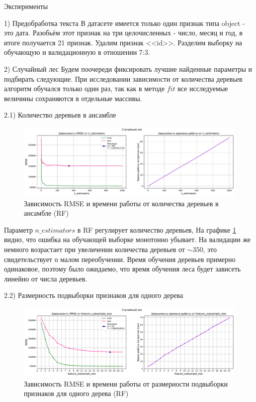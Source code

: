 \documentclass[a4paper,12pt,titlepage,finall]{article}
\begin{document}
\begin{section}{Эксперименты}
	
\begin{subsection}{1) Предобработка текста}
В датасете имеется только один признак типа object - это дата. Разобьём этот признак на три целочисленных - число, месяц и год, в итоге получается 21 признак. Удалим признак <<id>>. Разделим выборку на обучающую и валидационную в отношении 7:3.
\end{subsection}

\begin{subsection}{2) Случайный лес}
Будем поочереди фиксировать лучшие найденные параметры и подбирать следующие. При исследовании зависимости от количества деревьев алгоритм обучался только один раз, так как в методе $fit$ все исследуемые величины сохраняются в отдельные массивы.

\begin{subsubsection}{2.1) Количество деревьев в ансамбле}
\begin{figure}[H]
	\includegraphics[scale=0.9, width=17cm]{S_1.pdf}
	\centering
	\caption{Зависимость RMSE и времени работы от количества деревьев в ансамбле (RF)}
	\label{pic:1}
\end{figure}

Параметр $n\_estimators$ в RF регулирует количество деревьев,  На графике \ref{pic:1} видно, что ошибка на обучающей выборке монотонно убывает. На валидации же немного возрастает при увеличении количества деревьев от $\sim350$, это свидетельствует о малом переобучении. Время обучения деревьев примерно одинаковое, поэтому было ожидаемо, что время обучения леса будет зависеть линейно от числа деревьев.

\end{subsubsection}

\begin{subsubsection}{2.2) Размерность подвыборки признаков для одного дерева}
\begin{figure}[H]
	\includegraphics[scale=0.9, width=17cm]{S_2.pdf}
	\centering
	\caption{Зависимость RMSE и времени работы от размерности подвыборки признаков для одного дерева (RF)}
	\label{pic:2}
\end{figure}


\end{subsubsection}
\end{subsection}
\end{section}
\end{document}
